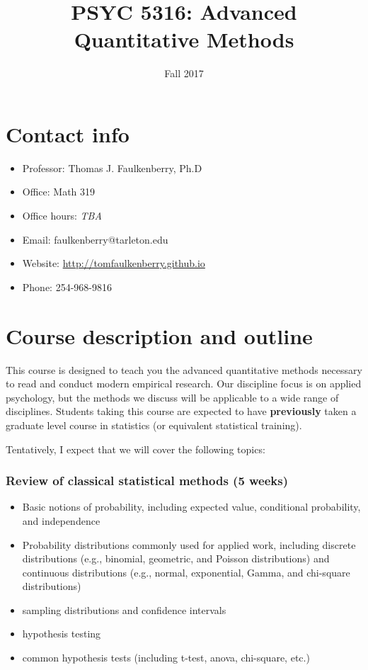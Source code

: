 \documentclass[10pt]{article}
\date{Fall 2017}
\title{PSYC 5316: Advanced Quantitative Methods}
\begin{document}
\maketitle

\section*{Contact info}
\label{sec-1}
\begin{itemize}
\item Professor: Thomas J. Faulkenberry, Ph.D
\item Office: Math 319
\item Office hours: \emph{TBA}
\item Email: faulkenberry@tarleton.edu
\item Website: \url{http://tomfaulkenberry.github.io}
\item Phone: 254-968-9816
\end{itemize}

\section*{Course description and outline}
\label{sec-2}

This course is designed to teach you the advanced quantitative methods necessary to read and conduct modern empirical research.  Our discipline focus is on applied psychology, but the methods we discuss will be applicable to a wide range of disciplines.  Students taking this course are expected to have \textbf{previously} taken a graduate level course in statistics (or equivalent statistical training).  

Tentatively, I expect that we will cover the following topics:

\subsubsection*{Review of classical statistical methods (5 weeks)}
\label{sec-2-0-1}
\begin{itemize}
\item Basic notions of probability, including expected value, conditional probability, and independence
\item Probability distributions commonly used for applied work, including discrete distributions (e.g., binomial, geometric, and Poisson distributions) and continuous distributions (e.g., normal, exponential, Gamma, and chi-square distributions)
\item sampling distributions and confidence intervals
\item hypothesis testing
\item common hypothesis tests (including t-test, anova, chi-square, etc.)
\end{itemize}
\end{document}
